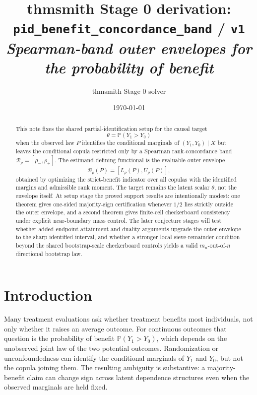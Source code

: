 \documentclass[11pt]{article}
\title{thmsmith Stage 0 derivation: \texttt{pid\_benefit\_concordance\_band} / \texttt{v1}%
  \\ \large\textit{Spearman-band outer envelopes for the probability of benefit}}
\author{thmsmith Stage 0 solver}
\date{\today}
\renewcommand{\Pr}{\mathbb{P}}
\theoremstyle{definition}
\theoremstyle{plain}
\theoremstyle{remark}
\begin{document}
\maketitle


\begin{abstract}
This note fixes the shared partial-identification setup for the causal target
\[
\theta=\Pr(Y_1>Y_0)
\]
when the observed law \(P\) identifies the conditional marginals of \((Y_1,Y_0)\mid X\) but leaves the conditional copula restricted only by a Spearman rank-concordance band \(\mathcal R_\rho=[\rho_-,\rho_+]\).  The estimand-defining functional is the evaluable outer envelope
\[
\mathcal B_\rho(P)=[L_\rho(P),U_\rho(P)],
\]
obtained by optimizing the strict-benefit indicator over all copulas with the identified margins and admissible rank moment.  The target remains the latent scalar \(\theta\), not the envelope itself.  At setup stage the proved support results are intentionally modest: one theorem gives one-sided majority-sign certification whenever \(1/2\) lies strictly outside the outer envelope, and a second theorem gives finite-cell checkerboard consistency under explicit near-boundary mass control.  The later conjecture stages will test whether added endpoint-attainment and duality arguments upgrade the outer envelope to the sharp identified interval, and whether a stronger local sieve-remainder condition beyond the shared bootstrap-scale checkerboard controls yields a valid \(m_n\)-out-of-\(n\) directional bootstrap law.
\end{abstract}

\section{Introduction}
Many treatment evaluations ask whether treatment benefits most individuals, not only whether it raises an average outcome.  For continuous outcomes that question is the probability of benefit \(\Pr(Y_1>Y_0)\), which depends on the unobserved joint law of the two potential outcomes.  Randomization or unconfoundedness can identify the conditional marginals of \(Y_1\) and \(Y_0\), but not the copula joining them.  The resulting ambiguity is substantive: a majority-benefit claim can change sign across latent dependence structures even when the observed marginals are held fixed.
\end{document}
